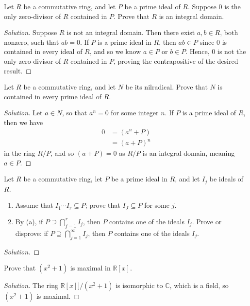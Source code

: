 \documentclass[12pt]{article}
\newenvironment{problem}[2][Problem]{\begin{trivlist}
\item[\hskip \labelsep {\bfseries #1}\hskip \labelsep {\bfseries #2.}]}{\end{trivlist}}
\newenvironment{solution}
  {\renewcommand\qedsymbol{$\blacksquare$}\begin{proof}[Solution]}
{\end{proof}}
\theoremstyle{remark}
\begin{document}
\begin{problem}{4.16}
  Let $R$ be a commutative ring, and let $P$ be a prime ideal of $R$.
  Suppose $0$ is the only zero-divisor of $R$ contained in $P$.
  Prove that $R$ is an integral domain.
\end{problem}
\begin{solution}
  Suppose $R$ is not an integral domain.
  Then there exist $a,b\in R$, both nonzero, such that $ab=0$.
  If $P$ is a prime ideal in $R$, then $ab\in P$ since $0$ is contained
  in every ideal of $R$, and so we know $a\in P$ or $b\in P$. 
  Hence, $0$ is not the only zero-divisor of $R$ contained in $P$,
  proving the contrapositive of the desired result.
\end{solution}

\begin{problem}{4.18}
  Let $R$ be a commutative ring, and let $N$ be its nilradical.
  Prove that $N$ is contained in every prime ideal of $R$.
\end{problem}
\begin{solution}
  Let $a\in N$, so that $a^n = 0$ for some integer $n$.
  If $P$ is a prime ideal of $R$, then we have
  \begin{align*}
    0 &= (a^n + P) \\
    &= (a+P)^n
  \end{align*}
  in the ring $R/P$, and so $(a+P) = 0$ as $R/P$ is an integral domain,
  meaning $a\in P$.
\end{solution}

\begin{problem}{4.19}
  Let $R$ be a commutative ring, let $P$ be a prime ideal in $R$, and let
  $I_j$ be ideals of $R$.
  \begin{enumerate}[label=(\alph*)]
    \item Assume that $I_1\cdots I_r\subseteq P$; prove that $I_J\subseteq P$
      for some $j$.
    \item By (a), if $P\supseteq \bigcap_{j=1}^{r} I_j$, then
      $P$ contains one of the ideals $I_j$.
      Prove or disprove: if $P\supseteq \bigcap_{j=1}^{\infty} I_j$,
      then $P$ contains one of the ideals $I_j$.
  \end{enumerate}
\end{problem}
\begin{solution}
  
\end{solution}<++>

\begin{problem}{4.22}
  Prove that $(x^2+1)$ is maximal in $\mathbb{R}[x]$.
\end{problem}
\begin{solution}
  The ring $\mathbb{R}[x]]/(x^2+1)$ is isomorphic to $\mathbb{C}$,
  which is a field, so $(x^2+1)$ is maximal.
\end{solution}
\end{document}

